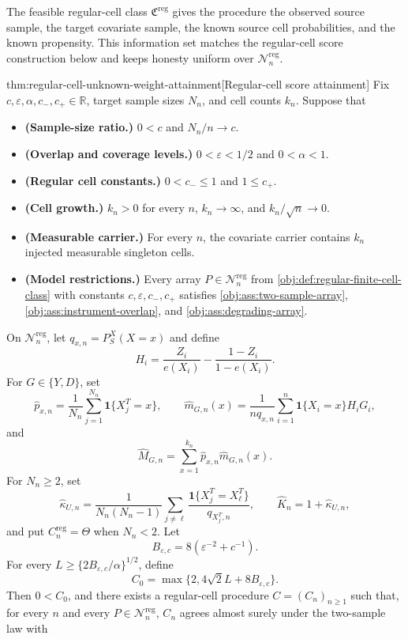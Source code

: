 The feasible regular-cell class \(\mathfrak C^{\mathrm{reg}}\) gives the procedure the observed source sample, the target covariate sample, the known source cell probabilities, and the known propensity. This information set matches the regular-cell score construction below and keeps honesty uniform over \(\mathcal N_n^{\mathrm{reg}}\).

\begin{theoremv}{thm:regular-cell-unknown-weight-attainment}[Regular-cell score attainment]
Fix \(c,\varepsilon,\alpha,c_-,c_+\in\mathbb R\), target sample sizes \(N_n\), and cell counts \(k_n\).  Suppose that
\begin{itemize}
\item \textbf{(Sample-size ratio.)} \(0<c\) and \(N_n/n\to c\).
\item \textbf{(Overlap and coverage levels.)} \(0<\varepsilon<1/2\) and \(0<\alpha<1\).
\item \textbf{(Regular cell constants.)} \(0<c_-\le 1\) and \(1\le c_+\).
\item \textbf{(Cell growth.)} \(k_n>0\) for every \(n\), \(k_n\to\infty\), and \(k_n/\sqrt n\to0\).
\item \textbf{(Measurable carrier.)} For every \(n\), the covariate carrier contains \(k_n\) injected measurable singleton cells.
\item \textbf{(Model restrictions.)} Every array \(P\in\mathcal N_n^{\mathrm{reg}}\) from \cref{obj:def:regular-finite-cell-class} with constants \(c,\varepsilon,c_-,c_+\) satisfies \cref{obj:ass:two-sample-array}, \cref{obj:ass:instrument-overlap}, and \cref{obj:ass:degrading-array}.
\end{itemize}
On \(\mathcal N_n^{\mathrm{reg}}\), let \(q_{x,n}=P_S^X(X=x)\) and define
\[
H_i=\frac{Z_i}{e(X_i)}-\frac{1-Z_i}{1-e(X_i)}.
\]
For \(G\in\{Y,D\}\), set
\[
\widehat p_{x,n}=\frac1{N_n}\sum_{j=1}^{N_n}\mathbf 1\{X_j^T=x\},
\qquad
\widehat m_{G,n}(x)=\frac1{nq_{x,n}}\sum_{i=1}^n
\mathbf 1\{X_i=x\}H_iG_i,
\]
and
\[
\widehat M_{G,n}=\sum_{x=1}^{k_n}\widehat p_{x,n}\widehat m_{G,n}(x).
\]
For \(N_n\ge2\), set
\[
\widehat\kappa_{U,n}
=
\frac1{N_n(N_n-1)}\sum_{j\ne\ell}
\frac{\mathbf 1\{X_j^T=X_\ell^T\}}{q_{X_j^T,n}},
\qquad
\widehat K_n=1+\widehat\kappa_{U,n},
\]
and put \(C_n^{\mathrm{reg}}=\Theta\) when \(N_n<2\).  Let
\[
B_{\varepsilon,c}=8(\varepsilon^{-2}+c^{-1}).
\]
For every \(L\ge\{2B_{\varepsilon,c}/\alpha\}^{1/2}\), define
\[
C_{0}=\max\{2,4\sqrt2L+8B_{\varepsilon,c}\}.
\]
Then \(0<C_0\), and there exists a regular-cell procedure \(C=(C_n)_{n\ge1}\) such that, for every \(n\) and every \(P\in\mathcal N_n^{\mathrm{reg}}\), \(C_n\) agrees almost surely under the two-sample law with

\end{theoremv}
